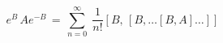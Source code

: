 \begin{equation}
e^B\, Ae^{-B} \, = \, \sum^\infty_{n=0} \;\frac{1}{n!} 
\left[ B,\,   \left[ B,\ldots \left[ B, A\right] \ldots \right] \right]
\end{equation}

